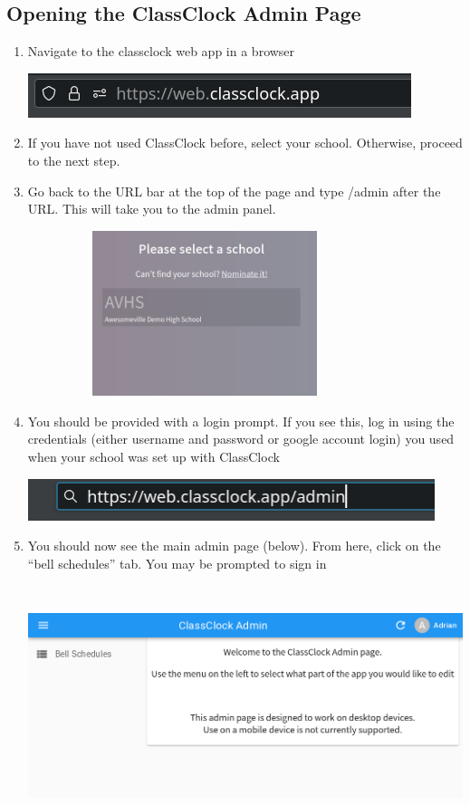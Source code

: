\documentclass{article}
\begin{document}
\subsection{Opening the ClassClock Admin Page}
\begin{enumerate}
\item {Navigate to the classclock web app in a browser}
\begin{center}
\includegraphics[width=4.4055in,height=0.5102in]{Mini20Manual-img007.png}
\end{center}
\item {If you have not used ClassClock before, select your school. Otherwise, proceed to the next step.}
\item {Go back to the URL bar at the top of the page and type /admin after the URL. This will take you to the admin panel.}
\begin{center}
\includegraphics[width=4.0744in,height=1.9016in]{Mini20Manual-img008.png}
\end{center}
\item {You should be provided with a login prompt. If you see this, log in using the credentials (either username and password
or google account login) you used when your school was set up with ClassClock}
\begin{center}
\includegraphics[width=4.6866in,height=0.4783in]{Mini20Manual-img009.png}
\end{center}
\item {You should now see the main admin page (below). From here, click on the “bell schedules” tab. You may be prompted to
sign in}
\begin{center}
\includegraphics[width=6.5in,height=2.7626in]{Mini20Manual-img004.png}

\end{center}
\end{enumerate}
\end{document}
